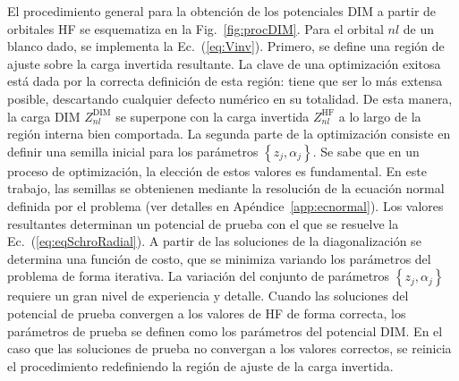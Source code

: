 El procedimiento general para la obtención de los potenciales DIM a 
partir de orbitales HF se esquematiza en la Fig.~\ref{fig:procDIM}. Para 
el orbital $nl$ de un blanco dado, se implementa la Ec.~(\ref{eq:Vinv}). 
Primero, se define una región de ajuste sobre la carga invertida 
resultante. La clave de una optimización exitosa está dada por la 
correcta definición de esta región: tiene que ser lo más extensa 
posible, descartando cualquier defecto numérico en su totalidad. De esta 
manera, la carga DIM $Z_{nl}^{\mathrm{DIM}}$ se superpone con la carga 
invertida $Z_{nl}^{\mathrm{HF}}$ a lo largo de la región interna bien 
comportada. La segunda parte de la optimización consiste en definir una 
semilla inicial para los parámetros $\left\{z_j,\alpha_j\right\}$. Se 
sabe que en un proceso de optimización, la elección de estos valores es 
fundamental. En este trabajo, las semillas se obtenienen mediante la 
resolución de la ecuación normal definida por el problema (ver detalles 
en Apéndice~\ref{app:ecnormal}). Los valores resultantes determinan un 
potencial de prueba con el que se resuelve la Ec.~(\ref{eq:eqSchroRadial}). 
A partir de las soluciones de la diagonalización se determina una 
función de costo, que se minimiza variando los parámetros del problema 
de forma iterativa. La variación del conjunto de parámetros $\left\{z_j,
\alpha_j\right\}$ requiere un gran nivel de experiencia y detalle. 
Cuando las soluciones del potencial de prueba convergen a los valores de 
HF de forma correcta, los parámetros de prueba se definen como los 
parámetros del potencial DIM. En el caso que las soluciones de prueba no 
convergan a los valores correctos, se reinicia el procedimiento 
redefiniendo la región de ajuste de la carga invertida.

